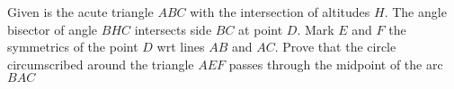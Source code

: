 Given is the acute triangle $ABC$ with the intersection of altitudes $H$.  The angle bisector of angle $BHC$ intersects side $BC$ at point $D$. Mark $E$ and $F$ the symmetrics of the point $D$ wrt lines $AB$ and $AC$. Prove that the circle circumscribed around the triangle $AEF$ passes through the midpoint of the arc $BAC$